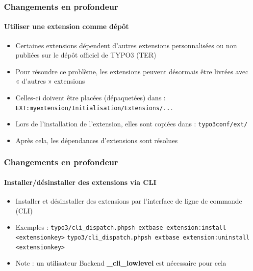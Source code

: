 
\begin{frame}[fragile]
	\frametitle{Changements en profondeur}
	\framesubtitle{Utiliser une extension comme dépôt}

	\begin{itemize}
		\item Certaines extensions dépendent d'autres extensions personnalisées ou non publiées sur le dépôt officiel de TYPO3 (TER)
		\item Pour résoudre ce problème, les extensions peuvent désormais être livrées avec « d'autres » extensions
		\item Celles-ci doivent être placées (dépaquetées) dans :\newline
			\texttt{EXT:myextension/Initialisation/Extensions/...}

		\item Lors de l'installation de l'extension, elles sont copiées dans :\newline
			\texttt{typo3conf/ext/}

		\item Après cela, les dépendances d'extensions sont résolues

	\end{itemize}

\end{frame}


\begin{frame}[fragile]
	\frametitle{Changements en profondeur}
	\framesubtitle{Installer/désinstaller des extensions via CLI}

	\begin{itemize}
		\item Installer et désinstaller des extensions par l'interface de ligne de commande (CLI)
		\item Exemples :
			\lstinline!typo3/cli_dispatch.phpsh extbase extension:install <extensionkey>!
			\lstinline!typo3/cli_dispatch.phpsh extbase extension:uninstall <extensionkey>!

		\item Note : un utilisateur Backend \textbf{\_cli\_lowlevel} est nécessaire pour cela
	\end{itemize}

\end{frame}

